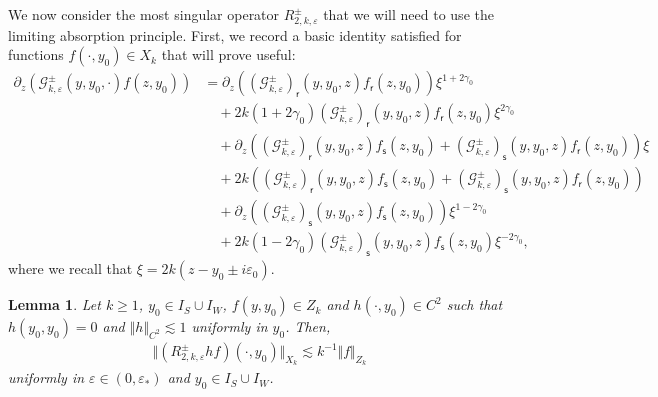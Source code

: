 \documentclass[11pt,reqno]{amsproc}
\newtheorem{lemma}[proposition]{Lemma}
\theoremstyle{definition}
\numberwithin{equation}{section}
\newcommand{\G}{{\mathcal{G}}}
\newcommand{\sr}{{\mathsf{r}}}
\newcommand{\s}{{\mathsf{s}}}
\newcommand{\ep}{\varepsilon}
\begin{document}
We now consider the most singular operator $R_{2,k,\ep}^\pm$ that we will need to use the limiting absorption principle. First, we record a basic identity satisfied for functions $f(\cdot,y_0)\in X_k$ that will prove useful:
\begin{equation}\label{eq:partialzGf}
\begin{split}
\partial_z \left( \G_{k,\ep}^\pm(y,y_0,\cdot) f(z,y_0) \right) &= \partial_z \left( \left( \G_{k,\ep}^\pm \right)_\sr(y,y_0,z) f_\sr(z, y_0) \right) \xi^{1+2\gamma_0} \\
&\quad + 2k(1+2\gamma_0)  \left( \G_{k,\ep}^\pm \right)_\sr(y,y_0,z) f_\sr(z, y_0) \xi^{2\gamma_0} \\
&\quad + \partial_z \left( \left( \G_{k,\ep}^\pm \right)_\sr(y,y_0,z) f_\s(z, y_0) + \left( \G_{k,\ep}^\pm \right)_\s(y,y_0,z) f_\sr(z, y_0) \right) \xi \\
&\quad + 2k \left( \left( \G_{k,\ep}^\pm \right)_\sr(y,y_0,z) f_\s(z, y_0) + \left( \G_{k,\ep}^\pm \right)_\s(y,y_0,z) f_\sr(z, y_0) \right)  \\
&\quad + \partial_z \left( \left( \G_{k,\ep}^\pm \right)_\s(y,y_0,z) f_\s(z, y_0) \right) \xi^{1-2\gamma_0} \\
&\quad + 2k(1-2\gamma_0)  \left( \G_{k,\ep}^\pm \right)_\s(y,y_0,z) f_\s(z, y_0) \xi^{-2\gamma_0},
\end{split}
\end{equation}
where we recall that $\xi=2k(z-y_0\pm i\ep_0)$. 

\begin{lemma}\label{lemma:R2mapsC1XktoXk}
Let $k\geq 1$, $y_0\in I_S\cup I_W$, $f(y,y_0)\in Z_k$ and $h(\cdot,y_0)\in C^2$ such that $h(y_0,y_0)=0$ and $\Vert h \Vert_{C^2}\lesssim 1$ uniformly in $y_0$. Then,
\begin{align}
\Vert (R_{2,k,\ep}^\pm hf)(\cdot,y_0) \Vert_{X_k} \lesssim  k^{-1}\Vert f \Vert_{Z_k}  
\end{align}
uniformly in $\ep \in (0,\ep_*)$ and $y_0\in I_S\cup I_W$.
\end{lemma}
\end{document}
